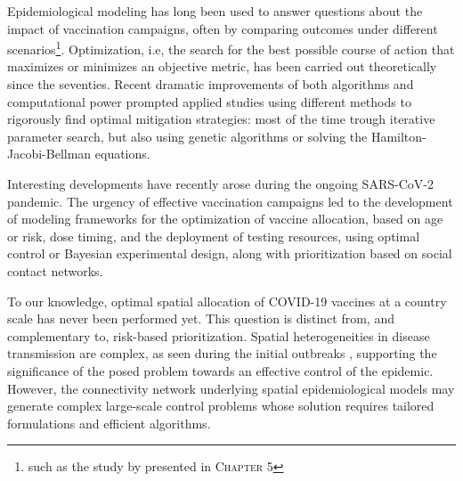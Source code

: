 Epidemiological modeling has long been used to answer questions about the impact of vaccination campaigns, often by comparing outcomes under different scenarios\footnote[][-9.3\baselineskip]{such as the study by \textcite{Lee:AchievingCoordinatedNational:2020} presented in \textsc{Chapter 5}}. Optimization, i.e, the search for the best possible course of action that maximizes or minimizes an objective metric, has been carried out theoretically since the seventies. Recent dramatic improvements of both algorithms\cite[-8.5\baselineskip]{Quirynen:MultipleShootingMicrosecond:2015} and computational power prompted applied studies using different methods to rigorously find optimal mitigation strategies: most of the time trough iterative parameter search, but also using genetic algorithms or solving the Hamilton-Jacobi-Bellman equations.

Interesting developments have recently arose during the ongoing SARS-CoV-2 pandemic\cite[-10\baselineskip]{Fitzpatrick:OptimizingAgespecificVaccination:2021, Thul:StochasticOptimizationVaccine:2021,Moore:VaccinationNonPharmaceuticalInterventions:2021}. The urgency of effective vaccination campaigns led to the development of modeling frameworks for the optimization of vaccine allocation, based on age or risk, dose timing\cite[-4\baselineskip]{Saad-Roy:EpidemiologicalEvolutionaryConsiderations:2021, Kadire:DelayedSecondDose:2021}, and the deployment of testing resources, using optimal control\cite{Acemoglu:OptimalAdaptiveTesting:2021} or Bayesian experimental design\cite{Chatzimanolakis:OptimalAllocationLimited:2020}, along with prioritization based on social contact networks\cite{Chen:PrioritizingAllocationCOVID19:2021}. 

To our knowledge, optimal spatial allocation of COVID-19 vaccines at a country scale has never been performed yet. This question is distinct from, and complementary to, risk-based prioritization. Spatial heterogeneities in disease transmission are complex, as seen during the initial outbreaks%
, supporting the significance of the posed problem towards an effective control of the epidemic. However, the connectivity network underlying spatial epidemiological models may generate complex large-scale control problems whose solution requires tailored formulations and efficient algorithms.  

